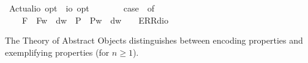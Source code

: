 \begin{isabellebody}
\ Actual{\isacharcolon}{\isacharcolon}{\isachardoublequoteopen}io\ opt\ {\isasymRightarrow}\ io\ opt{\isachardoublequoteclose}\ {\isacharparenleft}{\isachardoublequoteopen}\isactrlbold {\isasymA}\ {\isacharunderscore}{\isachardoublequoteclose}\ {\isacharbrackleft}{}{}{\isacharbrackright}\ {}{}{\isacharparenright}\ \ {\isachardoublequoteopen}\isactrlbold {\isasymA}{\isasymphi}\ {\isasymequiv}\ case\ {\isasymphi}\ of\ \isanewline
\ \ \ \ F{\isacharparenleft}{\isasympsi}{\isacharparenright}\ {\isasymRightarrow}\ F{\isacharparenleft}{\isasymlambda}w{\isachardot}\ {\isasympsi}\ dw{\isacharparenright}\ {\isacharbar}\ P{\isacharparenleft}{\isasympsi}{\isacharparenright}\ {\isasymRightarrow}\ P{\isacharparenleft}{\isasymlambda}w{\isachardot}\ {\isasympsi}\ dw{\isacharparenright}\ {\isacharbar}\ {\isacharunderscore}\ {\isasymRightarrow}\ ERR{\isacharparenleft}dio{\isacharparenright}{\isachardoublequoteclose}%
\begin{isamarkuptext}%
The Theory of Abstract Objects distinguishes between encoding properties  and 
  exemplifying properties  (for $n\geq 1$). 


\end{isamarkuptext}
\end{isabellebody}
